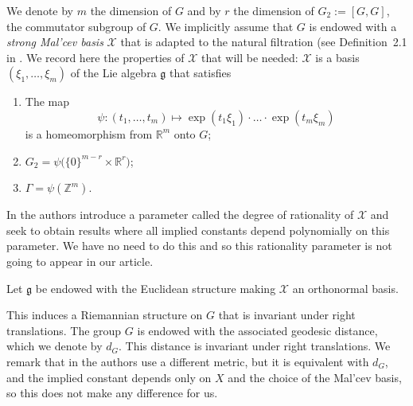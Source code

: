 \documentclass[11pt]{amsart}
\theoremstyle{definition}
\begin{document}
  We denote by  $m$  the dimension of $G$ and by $r$  the dimension of $G_2:=[G,G]$, the commutator subgroup of $G$.
We implicitly assume that $G$ is endowed with a \emph{strong Mal'cev basis} ${{\mathcal X}}$ that is adapted to the natural filtration (see Definition~2.1 in \cite{GT12a}. We record here the properties of ${{\mathcal X}}$ that will
be needed:    ${{\mathcal X}}$ is  a basis
$(\xi_1,\dots,\xi_m)$ of the Lie algebra $\mathfrak g$ that satisfies
\begin{enumerate}
\item
The map
$$
\psi\colon (t_1,\dots,t_m)\mapsto\exp(t_1\xi_1)\cdot\ldots\cdot\exp(t_m\xi_m)
$$
is a homeomorphism from ${{\mathbb R}}^m$ onto $G$;
\item
$G_2=\psi\bigl(\{0\}^{m-r}\times {{\mathbb R}}^r\bigr)$;
\item
\label{it:Malcev-Gamma}
$\Gamma=\psi({{\mathbb Z}}^m)$.
\end{enumerate}
In \cite{GT12a} the authors introduce a parameter called the degree of rationality of ${{\mathcal X}}$ and seek to obtain results where all implied constants depend polynomially on this parameter. We have no need to do this and so this rationality parameter is not going to appear in our article.

Let $\mathfrak g$ be endowed with the Euclidean structure making  ${{\mathcal X}}$  an orthonormal basis.
 
 This induces a  Riemannian structure on $G$ that is invariant under right translations. The group  $G$ is endowed with the associated geodesic distance, which we denote by  $d_G$. This distance is invariant under right translations. We remark that in \cite{GT12a} the authors use a different metric, but it is equivalent with $d_G$, and the implied constant depends only on $X$ and the choice of the Mal'cev basis,  so this does not make any difference for us.
\end{document}
